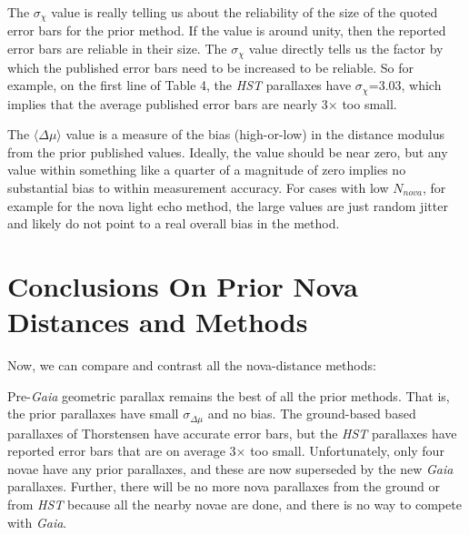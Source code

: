 \documentclass[a4paper,fleqn,usenatbib]{mnras}
\begin{document}
The $\sigma_{\chi}$ value is really telling us about the reliability of the size of the quoted error bars for the prior method.  If the value is around unity, then the reported error bars are reliable in their size.  The $\sigma_{\chi}$ value directly tells us the factor by which the published error bars need to be increased to be reliable.  So for example, on the first line of Table 4, the {\it HST} parallaxes have $\sigma_{\chi}$=3.03, which implies that the average published error bars are nearly 3$\times$ too small.

The $\langle \Delta \mu \rangle$ value is a measure of the bias (high-or-low) in the distance modulus from the prior published values.  Ideally, the value should be near zero, but any value within something like a quarter of a magnitude of zero implies no substantial bias to within measurement accuracy.  For cases with low $N_{nova}$, for example for the nova light echo method, the large values are just random jitter and likely do not point to a real overall bias in the method.

\section{Conclusions On Prior Nova Distances and Methods}

Now, we can compare and contrast all the nova-distance methods:

Pre-{\it Gaia} geometric parallax remains the best of all the prior methods.  That is, the prior parallaxes have small $\sigma_{\Delta \mu}$ and no bias.  The ground-based based parallaxes of Thorstensen have accurate error bars, but the {\it HST} parallaxes have reported error bars that are on average 3$\times$ too small.  Unfortunately, only four novae have any prior parallaxes, and these are now superseded by the new {\it Gaia} parallaxes.  Further, there will be no more nova parallaxes from the ground or from {\it HST} because all the nearby novae are done, and there is no way to compete with {\it Gaia}.
\end{document}
